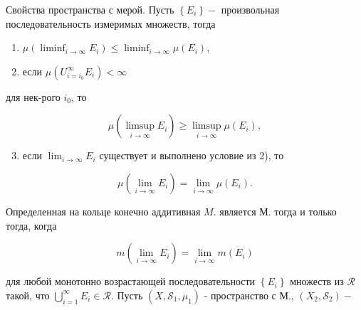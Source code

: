 \documentclass[10pt]{article}
\begin{document}
Свойства пространства с мерой. Пусть $\left\{E_{i}\right\}-$ произвольная последовательность измеримых множеств, тогда



\begin{enumerate}

  \item $\mu\left(\liminf _{i \rightarrow \infty} E_{i}\right) \leqslant \liminf _{i \rightarrow \infty} \mu\left(E_{i}\right)$,



  \item если $\mu\left(U_{i=i_{0}}^{\infty} E_{i}\right)<\infty$



\end{enumerate}



для нек-рого $i_{0}$, то



\[

\mu\left(\limsup _{i \rightarrow \infty} E_{i}\right) \geqslant \limsup _{i \rightarrow \infty} \mu\left(E_{i}\right),

\]



\begin{enumerate}

  \setcounter{enumi}{2}

  \item если $\lim _{i \rightarrow \infty} E_{i}$ существует и выполнено условие из 2), то

\end{enumerate}



\[

\mu\left(\lim _{i \rightarrow \infty} E_{i}\right)=\lim _{i \rightarrow \infty} \mu\left(E_{i}\right) .

\]



Определенная на кольце конечно аддитивная $M$. является М. тогда и только тогда, когда



\[

m\left(\lim _{i \rightarrow \infty} E_{i}\right)=\lim _{i \rightarrow \infty} m\left(E_{i}\right)

\]



для любой монотонно возрастающей последовательности $\left\{E_{i}\right\}$ множеств из $\mathscr{R}$ такой, что $\bigcup_{i=1}^{\infty} E_{i} \in \mathscr{R}$. Пусть $\left(X, \mathscr{S}_{1}, \mu_{1}\right)$ - пространство с М., $\left(X_{2}, \mathscr{S}_{2}\right)-$
\end{document}
